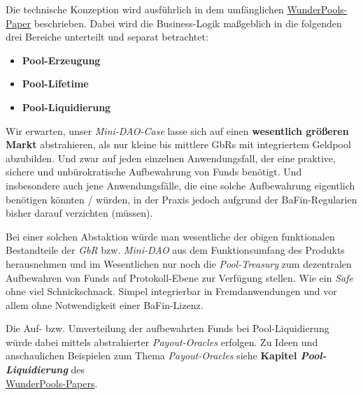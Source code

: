 \vspace{0.3cm}



\begin{Umsetzung*}

Die technische Konzeption wird ausführlich in dem umfänglichen \href{https://github.com/WunderPass/White-Paper/blob/main/pools.pdf}{WunderPools-Paper} beschrieben. Dabei wird die Business-Logik maßgeblich in die folgenden drei Bereiche unterteilt und separat betrachtet:

\begin{itemize}
  \item \textbf{Pool-Erzeugung}
  \item \textbf{Pool-Lifetime}
  \item \textbf{Pool-Liquidierung}
\end{itemize}

\end{Umsetzung*}

\vspace{0.3cm}


\begin{Ausblick*}

Wir erwarten, unser \textit{Mini-DAO-Case} lasse sich auf einen \textbf{wesentlich größeren Markt} abstrahieren, als nur kleine bis mittlere GbRs mit integriertem Geldpool abzubilden. Und zwar auf jeden einzelnen Anwendungsfall, der eine praktive, sichere und unbüro\-kratische Aufbewahrung von Funds benötigt. Und insbesondere auch jene Anwendungsfälle, die eine solche Aufbewahrung eigentlich benötigen könnten / würden, in der Praxis jedoch aufgrund der BaFin-Regularien bisher darauf verzichten (müssen).

\vspace{0.3cm}

Bei einer solchen Abstaktion würde man wesentliche der obigen funktionalen Bestandteile der \textit{GbR} bzw. \textit{Mini-DAO} aus dem Funktionsumfang des Produkts herausnehmen und im Wesentlichen nur noch die \textit{Pool-Treasury} zum dezentralen Aufbewahren von Funds auf Protokoll-Ebene zur Verfügung stellen. Wie ein \textit{Safe} ohne viel Schnickschnack. Simpel integrierbar in Fremdanwendungen und vor allem ohne Notwendigkeit einer BaFin-Lizenz. 

\vspace{0.3cm}

Die Auf- bzw. Umverteilung der aufbewahrten Funds bei Pool-Liquidierung würde dabei mittels abstrahierter \textit{Payout-Oracles} erfolgen. Zu Ideen und anschaulichen Beispielen zum Thema \textit{Payout-Oracles} siehe \textbf{Kapitel \textit{Pool-Liquidierung}} des \\ \href{https://github.com/WunderPass/White-Paper/blob/main/pools.pdf}{WunderPools-Papers}.

\end{Ausblick*}

\vspace{0.3cm}





\vspace{0.5cm}